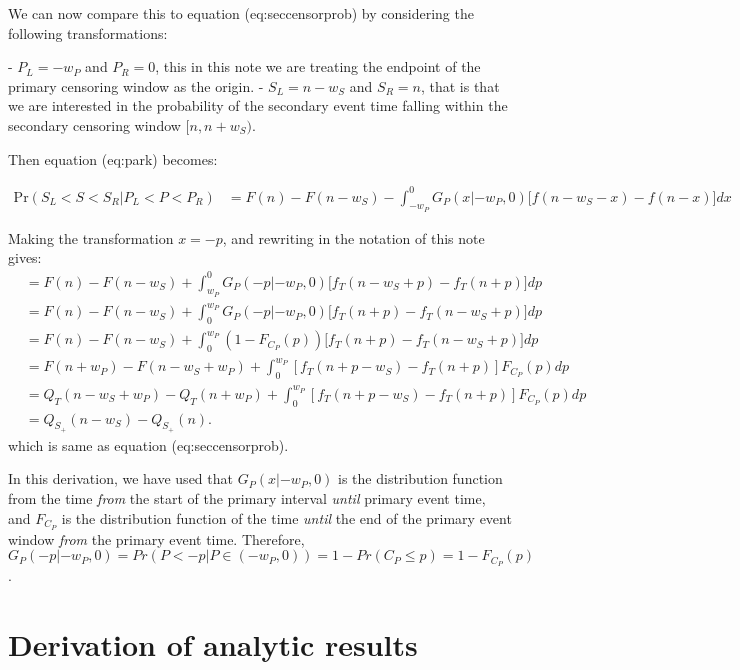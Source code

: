 \documentclass[10pt,letterpaper]{article}
\begin{document}
We can now compare this to equation \@ref(eq:seccensorprob) by considering the following transformations:

- $P_L = -w_P$ and $P_R = 0$, this in this note we are treating the endpoint of the primary censoring window as the origin.
-  $S_L = n-w_S$ and $S_R = n$, that is that we are interested in the probability of the secondary event time falling within the secondary censoring window $[n, n+ w_S)$.

Then equation \@ref(eq:park) becomes:

\begin{equation}
\begin{aligned}
\mathrm{Pr}(S_L < S < S_R | P_L < P < P_R) &= F(n) - F(n-w_S) - \int_{-w_P}^{0} G_P(x|-w_P, 0) \big[f(n - w_S - x) - f(n - x)\big] dx
\end{aligned}
\end{equation}



Making the transformation $x = -p$, and rewriting in the notation of this note gives:
\begin{equation}
\begin{aligned}
&= F(n) - F(n-w_S) + \int_{w_P}^{0} G_P(-p|-w_P, 0) \big[f_T(n - w_S + p) - f_T(n +p)\big] dp \\
&= F(n) - F(n-w_S) + \int_{0}^{w_P} G_P(-p|-w_P, 0) \big[f_T(n + p) - f_T(n - w_S +p)\big] dp\\
&= F(n) - F(n-w_S) + \int_{0}^{w_P} (1 - F_{C_P}(p)) \big[f_T(n + p) - f_T(n - w_S +p)\big] dp\\
&= F(n + w_P) - F(n-w_S + w_P) + \int_{0}^{w_P} [f_T(n + p - w_S) - f_T(n + p)] F_{C_P}(p) dp\\
&= Q_T(n-w_S + w_P) - Q_T(n + w_P) + \int_{0}^{w_P} [f_T(n + p - w_S) - f_T(n + p)] F_{C_P}(p) dp \\
&= Q_{S_+}(n-w_S) - Q_{S_+}(n ).
\end{aligned}
\end{equation}
which is same as equation \@ref(eq:seccensorprob).

In this derivation, we have used that $G_P(x|-w_P, 0)$ is the distribution function from the time \textit{from} the start of the primary interval \textit{until} primary event time, and $F_{C_P}$ is the distribution function of the time \textit{until} the end of the primary event window \textit{from} the primary event time. Therefore, $G_P(-p|-w_P, 0) = Pr(P < -p | P \in (-w_P, 0)) = 1 - Pr(C_P \leq p) = 1 - F_{C_P}(p)$.

\section{Derivation of analytic results}
\end{document}
